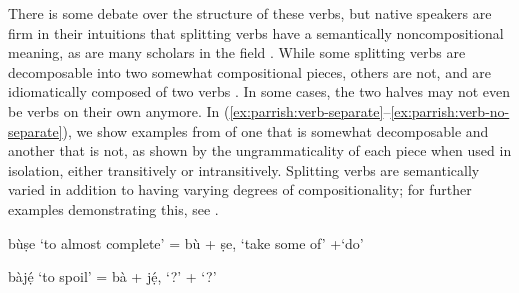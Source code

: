 \documentclass[output=paper,newtxmath,modfonts,nonflat,draftmode]{langsci/langscibook}
\begin{document}
There is some debate over the structure of these verbs, but native speakers are firm in their intuitions that splitting verbs have a semantically noncompositional meaning, as are many scholars in the field \citep{Bode2007,Awobuluyi1967,Awobuluyi1971,Bamgbose1966}. While some splitting verbs are decomposable into two somewhat compositional pieces, others are not, and are idiomatically composed of two verbs \citep{Awobuluyi1971}. In some cases, the two halves may not even be verbs on their own anymore. In (\ref{ex:parrish:verb-separate}–\ref{ex:parrish:verb-no-separate}), we show examples from \citet{Awobuluyi1971} of one  that is somewhat decomposable and another that is not, as shown by the ungrammaticality of each piece when used in isolation, either transitively or intransitively. Splitting verbs are semantically varied in addition to having varying degrees of compositionality; for further examples demonstrating this, see \citet{Awobuluyi1971}.

\ea bù\d{s}e `to almost complete' = bù  + \d{s}e, `take some of' +`do'
\label{ex:parrish:verb-separate}
\z 

\ea  bàj\d{é} `to spoil' = bà + j\d{é}, `?' + `?'
	

		
		\z

	
\label{ex:parrish:verb-no-separate}
\z 

\end{document}
